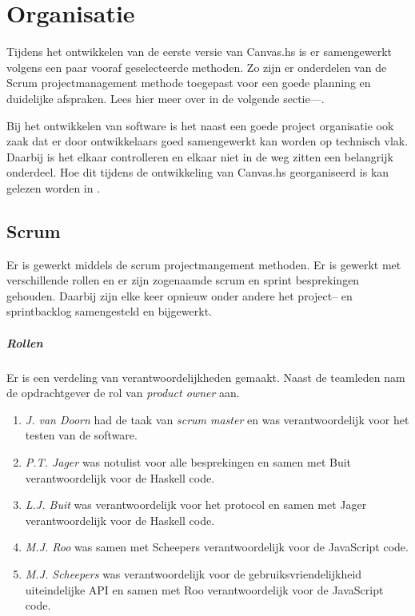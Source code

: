 \chapter{Organisatie}

Tijdens het ontwikkelen van de eerste versie van Canvas.hs is er samengewerkt volgens een paar vooraf geselecteerde methoden. Zo zijn er onderdelen van de Scrum projectmanagement methode toegepast voor een goede planning en duidelijke afspraken. Lees hier meer over in de volgende sectie—.

Bij het ontwikkelen van software is het naast een goede project organisatie ook zaak dat er door ontwikkelaars goed samengewerkt kan worden op technisch vlak. Daarbij is het elkaar controlleren en elkaar niet in de weg zitten een belangrijk onderdeel. Hoe dit tijdens de ontwikkeling van Canvas.hs georganiseerd is kan gelezen worden in .

\section{Scrum} \label{sec:scrum}

Er is gewerkt middels de scrum projectmangement methoden. Er is gewerkt met verschillende rollen en er zijn zogenaamde scrum en sprint besprekingen gehouden. Daarbij zijn elke keer opnieuw onder andere het project– en sprintbacklog samengesteld en bijgewerkt.

\paragraph{Rollen} Er is een verdeling van verantwoordelijkheden gemaakt. Naast de teamleden nam de opdrachtgever de rol van \emph{product owner} aan.
\begin{enumerate}
    \item \emph{J. van Doorn} had de taak van \emph{scrum master} en was verantwoordelijk voor het testen van de software.
    \item \emph{P.T. Jager} was notulist voor alle besprekingen en samen met Buit verantwoordelijk voor de Haskell code.
    \item \emph{L.J. Buit} was verantwoordelijk voor het protocol en samen met Jager verantwoordelijk voor de Haskell code.
    \item \emph{M.J. Roo} was samen met Scheepers verantwoordelijk voor de JavaScript code.
    \item \emph{M.J. Scheepers} was verantwoordelijk voor de gebruiksvriendelijkheid uiteindelijke API en samen met Roo verantwoordelijk voor de JavaScript code.
\end{enumerate}

